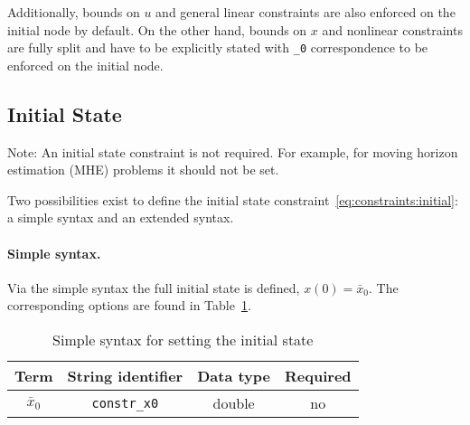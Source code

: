 \documentclass[english]{article}
\newcommand{\code}[1]{\texttt{#1}}
\newcommand{\str}[1]{\texttt{'#1'}}
\newcommand{\optional}{no}
\begin{document}
Additionally, bounds on $u$ and general linear constraints are also enforced on the initial node by default. On the other hand, bounds on $x$ and nonlinear constraints are fully split and have to be explicitly stated with \code{\_0} correspondence to be enforced on the initial node.

%
\subsection{Initial State}\label{sec:constraints:initial}
%
Note: An initial state constraint is not required.
For example, for moving horizon estimation (MHE) problems it should not be set.

Two possibilities exist to define the initial state constraint~\eqref{eq:constraints:initial}: a simple syntax and an extended syntax.

\paragraph{Simple syntax.}
Via the simple syntax the full initial state is defined, $x(0)=\bar{x}_0$.
The corresponding options are found in Table~\ref{tab:constraints:simplesyntax}.
\begin{table}[ht!]
    \centering
    \caption{Simple syntax for setting the initial state} \label{tab:constraints:simplesyntax}
    \begin{tabular}{cccc}
        \toprule
        Term & String identifier & Data type & Required \\ \midrule
        $ \bar{x}_0 $ & \code{constr\_x0} & double & \optional \\
        \bottomrule
    \end{tabular}
\end{table}
%
\end{document}
